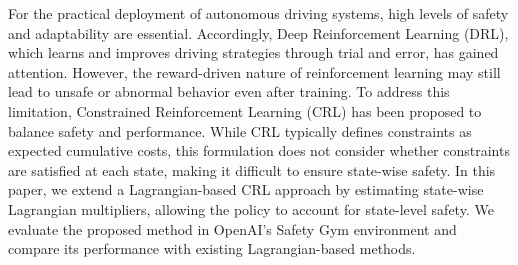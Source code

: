 
For the practical deployment of autonomous driving systems, high levels of safety and adaptability are essential.
Accordingly, Deep Reinforcement Learning (DRL), which learns and improves driving strategies through trial and error, has gained attention.
However, the reward-driven nature of reinforcement learning may still lead to unsafe or abnormal behavior even after training.
To address this limitation, Constrained Reinforcement Learning (CRL) has been proposed to balance safety and performance.
While CRL typically defines constraints as expected cumulative costs, this formulation does not consider whether constraints are satisfied at each state, making it difficult to ensure state-wise safety.
In this paper, we extend a Lagrangian-based CRL approach by estimating state-wise Lagrangian multipliers, allowing the policy to account for state-level safety.
We evaluate the proposed method in OpenAI's Safety Gym environment and compare its performance with existing Lagrangian-based methods.